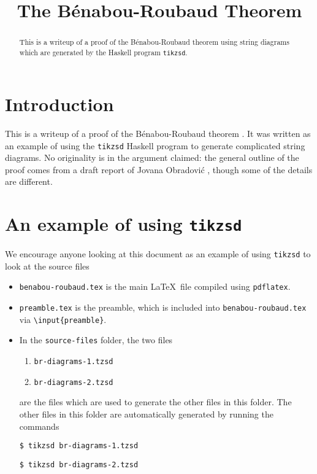 \documentclass{amsart}
\begin{document}
\title{The B\'enabou-Roubaud Theorem}
\begin{abstract}
    This is a writeup of a proof of the B\'enabou-Roubaud theorem
        using string diagrams 
        which are generated by the
        Haskell program \texttt{tikzsd}.
\end{abstract}
\maketitle
\section{Introduction}
This is a writeup of a proof of the B\'enabou-Roubaud theorem
        \cite{br-monades-et-descent}.
It was written as an example of using
    the \texttt{tikzsd} Haskell program
    to generate complicated string diagrams.
No originality is in the argument claimed: the general outline of the proof
    comes from a draft report of Jovana Obradovi\'c \cite{o-br-via-string},
    though some of the details are different.

\section{An example of using \texttt{tikzsd}}
We encourage anyone looking at this document
    as an example of using \texttt{tikzsd} to look at the source files
\begin{itemize}
    \item \texttt{benabou-roubaud.tex}  
        is the main \LaTeX\ file compiled using \texttt{pdflatex}.
    \item \texttt{preamble.tex} is the preamble,
        which is included into \texttt{benabou-roubaud.tex}
        via \texttt{\textbackslash input\{preamble\}}.
    \item In the \texttt{source-files} folder, the two files
        \begin{enumerate}
        \item \texttt{br-diagrams-1.tzsd}
        \item \texttt{br-diagrams-2.tzsd}
        \end{enumerate}
        are the files which are used to generate the other files in this folder.
        The other files in this folder are automatically generated by running the commands

            \texttt{\$ tikzsd br-diagrams-1.tzsd}

            \texttt{\$ tikzsd br-diagrams-2.tzsd}
\end{itemize}
\end{document}
